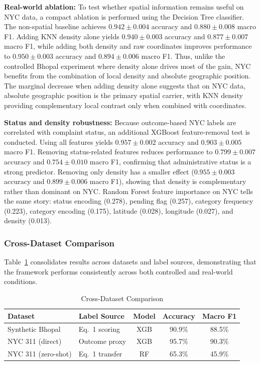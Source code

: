\documentclass[12pt,onecolumn,draftclsnofoot]{IEEEtran}
\begin{document}
\textbf{Real-world ablation:} To test whether spatial information remains useful on NYC data, a compact ablation is performed using the Decision Tree classifier. The non-spatial baseline achieves $0.942 \pm 0.004$ accuracy and $0.880 \pm 0.008$ macro F1. Adding KNN density alone yields $0.940 \pm 0.003$ accuracy and $0.877 \pm 0.007$ macro F1, while adding both density and raw coordinates improves performance to $0.950 \pm 0.003$ accuracy and $0.894 \pm 0.006$ macro F1. Thus, unlike the controlled Bhopal experiment where density alone drives most of the gain, NYC benefits from the combination of local density and absolute geographic position. The marginal decrease when adding density alone suggests that on NYC data, absolute geographic position is the primary spatial carrier, with KNN density providing complementary local contrast only when combined with coordinates.

\textbf{Status and density robustness:} Because outcome-based NYC labels are correlated with complaint status, an additional XGBoost feature-removal test is conducted. Using all features yields $0.957 \pm 0.002$ accuracy and $0.903 \pm 0.005$ macro F1. Removing status-related features reduces performance to $0.799 \pm 0.007$ accuracy and $0.754 \pm 0.010$ macro F1, confirming that administrative status is a strong predictor. Removing only density has a smaller effect ($0.955 \pm 0.003$ accuracy and $0.899 \pm 0.006$ macro F1), showing that density is complementary rather than dominant on NYC. Random Forest feature importance on NYC tells the same story: status encoding (0.278), pending flag (0.257), category frequency (0.223), category encoding (0.175), latitude (0.028), longitude (0.027), and density (0.013).

\subsubsection{Cross-Dataset Comparison}

Table~\ref{tab:cross_dataset} consolidates results across datasets and label sources, demonstrating that the framework performs consistently across both controlled and real-world conditions.

\begin{table}[h]
\centering
\caption{Cross-Dataset Comparison}
\label{tab:cross_dataset}
\setlength{\tabcolsep}{3pt}
\begin{tabular}{llccc}
\toprule
Dataset & Label Source & Model & Accuracy & Macro F1 \\
\midrule
Synthetic Bhopal & Eq.~1 scoring & XGB & 90.9\% & 88.5\% \\
NYC 311 (direct) & Outcome proxy & XGB & 95.7\% & 90.3\% \\
NYC 311 (zero-shot) & Eq.~1 transfer & RF & 65.3\% & 45.9\% \\
\bottomrule
\end{tabular}
\end{table}
\end{document}
